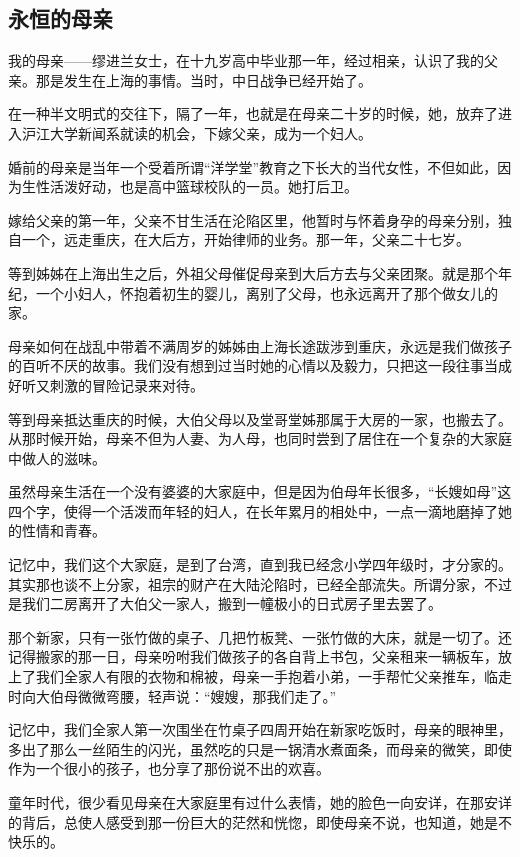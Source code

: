 \subsection{永恒的母亲}


\par 我的母亲——缪进兰女士，在十九岁高中毕业那一年，经过相亲，认识了我的父亲。那是发生在上海的事情。当时，中日战争已经开始了。
\par 在一种半文明式的交往下，隔了一年，也就是在母亲二十岁的时候，她，放弃了进入沪江大学新闻系就读的机会，下嫁父亲，成为一个妇人。
\par 婚前的母亲是当年一个受着所谓“洋学堂”教育之下长大的当代女性，不但如此，因为生性活泼好动，也是高中篮球校队的一员。她打后卫。
\par 嫁给父亲的第一年，父亲不甘生活在沦陷区里，他暂时与怀着身孕的母亲分别，独自一个，远走重庆，在大后方，开始律师的业务。那一年，父亲二十七岁。
\par 等到姊姊在上海出生之后，外祖父母催促母亲到大后方去与父亲团聚。就是那个年纪，一个小妇人，怀抱着初生的婴儿，离别了父母，也永远离开了那个做女儿的家。
\par 母亲如何在战乱中带着不满周岁的姊姊由上海长途跋涉到重庆，永远是我们做孩子的百听不厌的故事。我们没有想到过当时她的心情以及毅力，只把这一段往事当成好听又刺激的冒险记录来对待。
\par 等到母亲抵达重庆的时候，大伯父母以及堂哥堂姊那属于大房的一家，也搬去了。从那时候开始，母亲不但为人妻、为人母，也同时尝到了居住在一个复杂的大家庭中做人的滋味。
\par 虽然母亲生活在一个没有婆婆的大家庭中，但是因为伯母年长很多，“长嫂如母”这四个字，使得一个活泼而年轻的妇人，在长年累月的相处中，一点一滴地磨掉了她的性情和青春。
\par 记忆中，我们这个大家庭，是到了台湾，直到我已经念小学四年级时，才分家的。其实那也谈不上分家，祖宗的财产在大陆沦陷时，已经全部流失。所谓分家，不过是我们二房离开了大伯父一家人，搬到一幢极小的日式房子里去罢了。
\par 那个新家，只有一张竹做的桌子、几把竹板凳、一张竹做的大床，就是一切了。还记得搬家的那一日，母亲吩咐我们做孩子的各自背上书包，父亲租来一辆板车，放上了我们全家人有限的衣物和棉被，母亲一手抱着小弟，一手帮忙父亲推车，临走时向大伯母微微弯腰，轻声说：“嫂嫂，那我们走了。”
\par 记忆中，我们全家人第一次围坐在竹桌子四周开始在新家吃饭时，母亲的眼神里，多出了那么一丝陌生的闪光，虽然吃的只是一锅清水煮面条，而母亲的微笑，即使作为一个很小的孩子，也分享了那份说不出的欢喜。
\par 童年时代，很少看见母亲在大家庭里有过什么表情，她的脸色一向安详，在那安详的背后，总使人感受到那一份巨大的茫然和恍惚，即使母亲不说，也知道，她是不快乐的。

